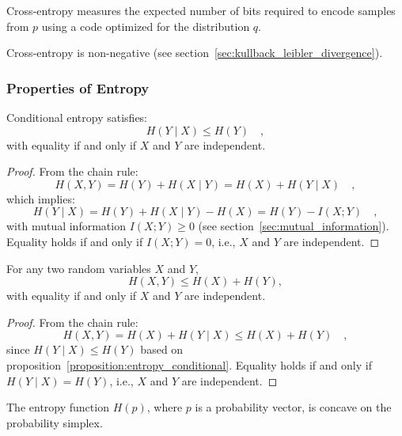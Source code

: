 \documentclass[../../main.tex]{subfiles}
\begin{document}
\begin{remark}
    Cross-entropy measures the expected number of bits required to encode samples from \( p \) using a code optimized for the distribution \( q \).
\end{remark}

\begin{remark}
    Cross-entropy is non-negative (see section~\ref{sec:kullback_leibler_divergence}).
\end{remark}

\bigskip
\subsubsection{Properties of Entropy}

\begin{proposition}
    \label{proposition:entropy_conditional}
    Conditional entropy satisfies:
    \[
        H(Y \mid X) \leq H(Y) \quad ,
    \]
    with equality if and only if \( X \) and \( Y \) are independent.
\end{proposition}
\vspace{-2.5em}
\begin{proof}
    From the chain rule:
    \[
        H(X, Y) = H(Y) + H(X \mid Y) = H(X) + H(Y \mid X) \quad ,
    \]
    which implies:
    \[
        H(Y \mid X) = H(Y) + H(X \mid Y) - H(X) = H(Y) - I(X; Y) \quad ,
    \]
    with mutual information \( I(X; Y) \geq 0 \) (see section~\ref{sec:mutual_information}). Equality holds if and only if \( I(X; Y) = 0 \), i.e., \( X \) and \( Y \) are independent.
\end{proof}

\medskip
\begin{corollary}
    For any two random variables \( X \) and \( Y \),
    \[
        H(X, Y) \leq H(X) + H(Y),
    \]
    with equality if and only if \( X \) and \( Y \) are independent.
\end{corollary}
\vspace{-2.5em}
\begin{proof}
    From the chain rule:
    \[
        H(X, Y) = H(X) + H(Y \mid X) \leq H(X) + H(Y) \quad ,
    \]
    since \( H(Y \mid X) \leq H(Y) \) based on proposition~\ref{proposition:entropy_conditional}. Equality holds if and only if \( H(Y \mid X) = H(Y) \), i.e., \( X \) and \( Y \) are independent.
\end{proof}

\medskip
\begin{theorem}
The entropy function \( H(p) \), where \( p \) is a probability vector, is concave on the probability simplex.
\end{theorem}
\end{document}
